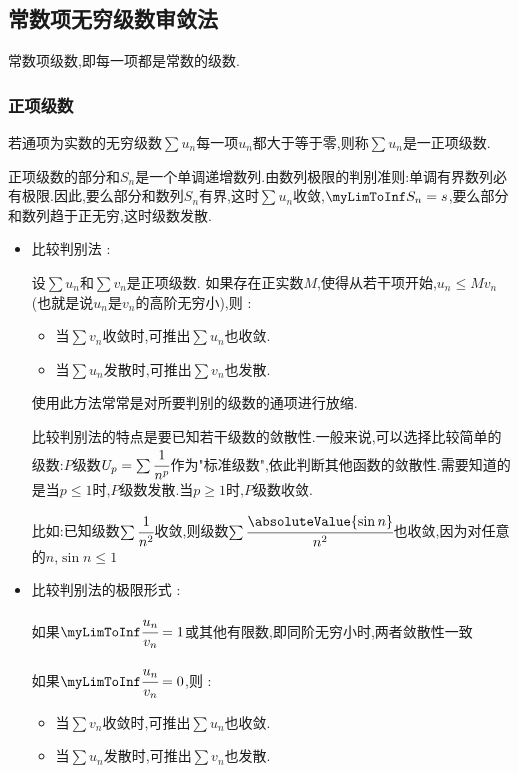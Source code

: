{{\subsection{常数项无穷级数审敛法}{
  常数项级数,即每一项都是常数的级数.

  \subsubsection{正项级数}{
    若通项为实数的无穷级数$\sum u_n$每一项$u_n$都大于等于零,则称$\sum u_n$是一正项级数.

    正项级数的部分和$S_n$是一个单调递增数列.由数列极限的判别准则:单调有界数列必有极限.因此,要么部分和数列$S_n$有界,这时$\sum u_n$收敛,$\myLimToInf S_n = s$,要么部分和数列趋于正无穷,这时级数发散.

    \begin{itemize}
      \item {
            比较判别法 :

            设$\sum u_n$和$\sum v_n$是正项级数.
            如果存在正实数$M$,使得从若干项开始,$u_n \leq Mv_n$(也就是说$u_n$是$v_n$的高阶无穷小),则 :
            \begin{itemize}
              \item 当$\sum v_n$收敛时,可推出$\sum u_n$也收敛.
              \item 当$\sum u_n$发散时,可推出$\sum v_n$也发散.
            \end{itemize}

            使用此方法常常是对所要判别的级数的通项进行放缩.

            比较判别法的特点是要已知若干级数的敛散性.一般来说,可以选择比较简单的级数:$P$级数$U_p = \sum\cfrac{1}{n^p}$作为"标准级数",依此判断其他函数的敛散性.需要知道的是当$p \leq 1$时,$P$级数发散.当$p \geq 1$时,$P$级数收敛.

            比如:已知级数$\sum \cfrac{1}{n^2}$收敛,则级数$\sum \cfrac{\absoluteValue{\sin n}}{n^2}$也收敛,因为对任意的$n$,$\sin n \leq 1$
            }
      \item{
            比较判别法的极限形式 :

            如果$\myLimToInf\cfrac{u_n}{v_n} = 1$或其他有限数,即同阶无穷小时,两者敛散性一致

            如果$\myLimToInf\cfrac{u_n}{v_n} = 0$,则 :
            \begin{itemize}
              \item 当$\sum v_n$收敛时,可推出$\sum u_n$也收敛.
              \item 当$\sum u_n$发散时,可推出$\sum v_n$也发散.
            \end{itemize}

}
\end{itemize}}}}}
